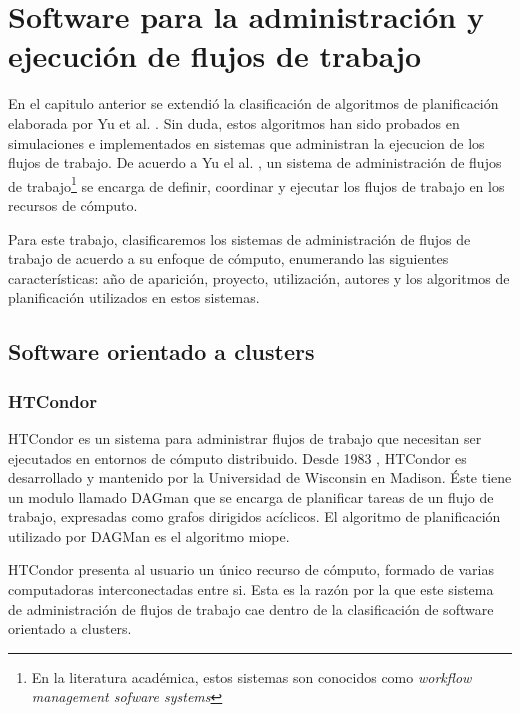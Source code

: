 \chapter[Software para flujos de trabajo]{Software para la administración y ejecución de flujos de trabajo}

En el capitulo anterior se extendió la clasificación de algoritmos de planificación elaborada por Yu et al. \cite{yu2008workflow}. Sin duda, estos algoritmos han sido probados en simulaciones e implementados en sistemas que administran la ejecucion de los flujos de trabajo. De acuerdo a Yu el al. \cite{yu2008workflow}, un sistema de administración de flujos de trabajo\footnote{En la literatura académica, estos sistemas son conocidos como \emph{workflow management sofware systems}} se encarga de definir, coordinar y ejecutar los flujos de trabajo en los recursos de cómputo.

Para este trabajo, clasificaremos los sistemas de administración de flujos de trabajo de acuerdo a su enfoque de cómputo, enumerando las siguientes características: año de aparición, proyecto, utilización, autores y los algoritmos de planificación utilizados en estos sistemas.

\section{Software orientado a clusters}


\subsection{HTCondor}

HTCondor \cite{condor-practice} es un sistema para administrar flujos de trabajo que necesitan ser ejecutados en entornos de cómputo distribuido. Desde 1983 \cite{htcondor2014webpage}, HTCondor es desarrollado y mantenido por la Universidad de Wisconsin en Madison. Éste tiene un modulo llamado DAGman que se encarga de planificar tareas de un flujo de trabajo, expresadas como grafos dirigidos acíclicos. El algoritmo de planificación utilizado por DAGMan es el algoritmo miope. 

HTCondor presenta al usuario un único recurso de cómputo, formado de varias computadoras interconectadas entre si. Esta es la razón por la que este sistema de administración de flujos de trabajo cae dentro de la clasificación de software orientado a clusters.

